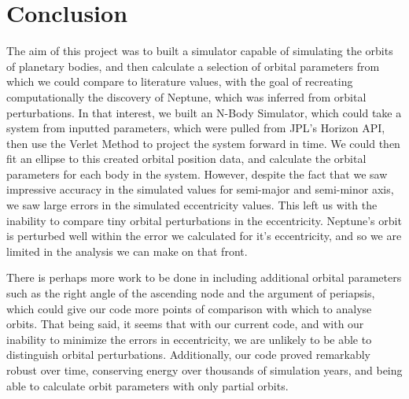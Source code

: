 \documentclass[a4paper,12pt]{article} %
\numberwithin{equation}{section} %
\numberwithin{figure}{section} %
\begin{document}
\section{Conclusion}
The aim of this project was to built a simulator capable of simulating the orbits of planetary bodies, and then calculate a selection of orbital parameters from which we could compare to literature values, with the goal of recreating computationally the discovery of Neptune, which was inferred from orbital perturbations. In that interest, we built an N-Body Simulator, which could take a system from inputted parameters, which were pulled from JPL's Horizon API, then use the Verlet Method to project the system forward in time. We could then fit an ellipse to this created orbital position data, and calculate the orbital parameters for each body in the system. However, despite the fact that we saw impressive accuracy in the simulated values for semi-major and semi-minor axis, we saw large errors in the simulated eccentricity values. This left us with the inability to compare tiny orbital perturbations in the eccentricity. Neptune's orbit is perturbed well within the error we calculated for it's eccentricity, and so we are limited in the analysis we can make on that front.

There is perhaps more work to be done in including additional orbital parameters such as the right angle of the ascending node and the argument of periapsis, which could give our code more points of comparison with which to analyse orbits. That being said, it seems that with our current code, and with our inability to minimize the errors in eccentricity, we are unlikely to be able to distinguish orbital perturbations. Additionally, our code proved remarkably robust over time, conserving energy over thousands of simulation years, and being able to calculate orbit parameters with only partial orbits.




\end{document}
